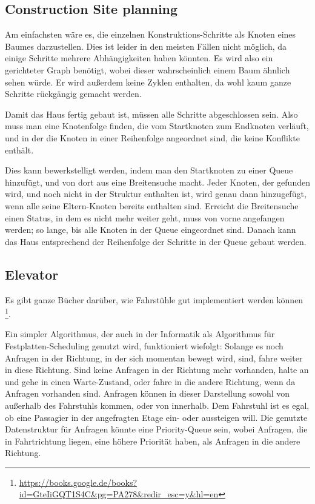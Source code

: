 \documentclass[12pt,a4paper]{article}
\begin{document}
\subsection*{Construction Site planning}
Am einfachsten wäre es, die einzelnen Konstruktions-Schritte als Knoten
eines Baumes darzustellen. Dies ist leider in den meisten Fällen nicht
möglich, da einige Schritte mehrere Abhängigkeiten haben könnten.
Es wird also ein gerichteter Graph benötigt, wobei dieser wahrscheinlich
einem Baum ähnlich sehen würde. Er wird außerdem keine Zyklen enthalten,
da wohl kaum ganze Schritte rückgängig gemacht werden.

Damit das Haus fertig gebaut ist, müssen alle Schritte abgeschlossen
sein. Also muss man eine Knotenfolge finden, die vom Startknoten
zum Endknoten verläuft, und in der die Knoten in einer Reihenfolge angeordnet sind,
die keine Konflikte enthält.

Dies kann bewerkstelligt werden, indem man den Startknoten
zu einer Queue hinzufügt, und von dort aus eine Breitensuche macht.
Jeder Knoten, der gefunden wird, und noch nicht in der Struktur
enthalten ist, wird genau dann hinzugefügt, wenn alle seine Eltern-Knoten
bereits enthalten sind.
Erreicht die Breitensuche einen Status, in dem es nicht mehr weiter geht,
muss von vorne angefangen werden; so lange, bis alle Knoten in der Queue
eingeordnet sind. Danach kann das Haus entsprechend der Reihenfolge der Schritte
in der Queue gebaut werden.

\subsection*{Elevator}
Es gibt ganze Bücher darüber, wie Fahrstühle gut implementiert werden können
\footnote{\url{https://books.google.de/books?id=GteIiGQT1S4C&pg=PA278&redir_esc=y&hl=en}}.

Ein simpler Algorithmus, der auch in der Informatik als Algorithmus für Festplatten-Scheduling
genutzt wird, funktioniert wiefolgt:
Solange es noch Anfragen in der Richtung, in der sich momentan bewegt wird, sind,
fahre weiter in diese Richtung. Sind keine Anfragen in der Richtung mehr vorhanden,
halte an und gehe in einen Warte-Zustand, oder fahre in die andere Richtung, wenn
da Anfragen vorhanden sind.
Anfragen können in dieser Darstellung sowohl von außerhalb des Fahrstuhls kommen,
oder von innerhalb. Dem Fahrstuhl ist es egal, ob eine Passagier in der angefragten
Etage ein- oder aussteigen will.
Die genutzte Datenstruktur für Anfragen könnte eine Priority-Queue sein,
wobei Anfragen, die in Fahrtrichtung liegen, eine höhere Priorität haben,
als Anfragen in die andere Richtung.
\end{document}
